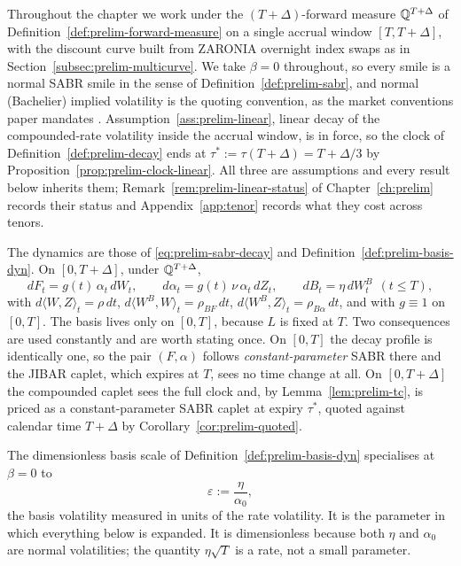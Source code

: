 \documentclass[../../../main.tex]{subfiles}
\begin{document}
Throughout the chapter we work under the $(T+\Delta)$-forward measure $\mathbb{Q}^{T+\Delta}$ of Definition~\ref{def:prelim-forward-measure} on a single accrual window $[T,T+\Delta]$, with the discount curve built from ZARONIA overnight index swaps as in Section~\ref{subsec:prelim-multicurve}. We take $\beta=0$ throughout, so every smile is a normal SABR smile in the sense of Definition~\ref{def:prelim-sabr}, and normal (Bachelier) implied volatility is the quoting convention, as the market conventions paper mandates \citep[\S8, p.~26]{sarb2024conv}. Assumption~\ref{ass:prelim-linear}, linear decay of the compounded-rate volatility inside the accrual window, is in force, so the clock of Definition~\ref{def:prelim-decay} ends at $\tau^*:=\tau(T+\Delta)=T+\Delta/3$ by Proposition~\ref{prop:prelim-clock-linear}. All three are assumptions and every result below inherits them; Remark~\ref{rem:prelim-linear-status} of Chapter~\ref{ch:prelim} records their status and Appendix~\ref{app:tenor} records what they cost across tenors.

The dynamics are those of \eqref{eq:prelim-sabr-decay} and Definition~\ref{def:prelim-basis-dyn}. On $[0,T+\Delta]$, under $\mathbb{Q}^{T+\Delta}$,
\begin{equation}\label{eq:ident-dyn}
dF_t=g(t)\,\alpha_t\,dW_t,\qquad d\alpha_t=g(t)\,\nu\,\alpha_t\,dZ_t,\qquad dB_t=\eta\,dW^B_t\ \ (t\le T),
\end{equation}
with $d\langle W,Z\rangle_t=\rho\,dt$, $d\langle W^B,W\rangle_t=\rho_{BF}\,dt$, $d\langle W^B,Z\rangle_t=\rho_{B\alpha}\,dt$, and with $g\equiv1$ on $[0,T]$. The basis lives only on $[0,T]$, because $L$ is fixed at $T$. Two consequences are used constantly and are worth stating once. On $[0,T]$ the decay profile is identically one, so the pair $(F,\alpha)$ follows \emph{constant-parameter} SABR there and the JIBAR caplet, which expires at $T$, sees no time change at all. On $[0,T+\Delta]$ the compounded caplet sees the full clock and, by Lemma~\ref{lem:prelim-tc}, is priced as a constant-parameter SABR caplet at expiry $\tau^*$, quoted against calendar time $T+\Delta$ by Corollary~\ref{cor:prelim-quoted}.

The dimensionless basis scale of Definition~\ref{def:prelim-basis-dyn} specialises at $\beta=0$ to
\begin{equation}\label{eq:ident-eps}
\varepsilon:=\frac{\eta}{\alpha_0},
\end{equation}
the basis volatility measured in units of the rate volatility. It is the parameter in which everything below is expanded. It is dimensionless because both $\eta$ and $\alpha_0$ are normal volatilities; the quantity $\eta\sqrt T$ is a rate, not a small parameter.
\end{document}
